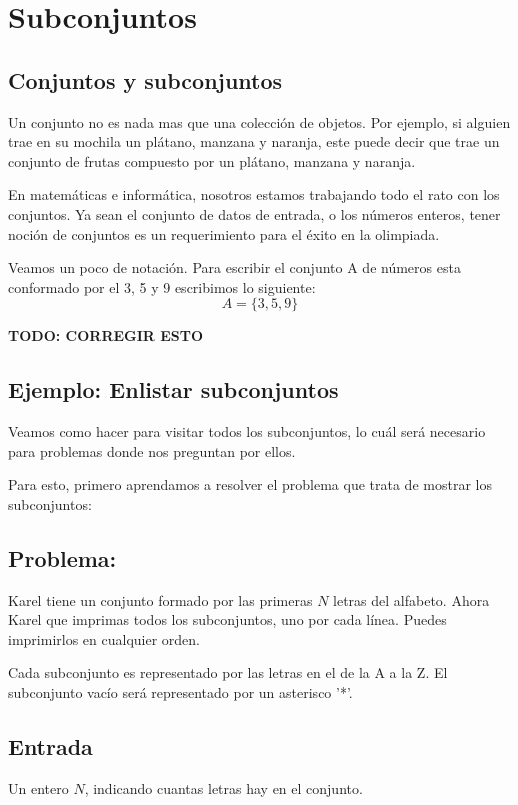 \section{Subconjuntos}

\subsection{Conjuntos y subconjuntos}

Un conjunto no es nada mas que una colección de objetos. Por ejemplo, si alguien trae en su mochila un plátano, manzana y naranja, este puede decir que trae un conjunto de frutas compuesto por un plátano, manzana y naranja.

En matemáticas e informática, nosotros estamos trabajando todo el rato con los conjuntos. Ya sean el conjunto de datos de entrada, o los números enteros, tener noción de conjuntos es un requerimiento para el éxito en la olimpiada.

Veamos un poco de notación. Para escribir el conjunto A de números esta conformado por el 3, 5 y 9 escribimos lo siguiente:
\[A=\{3,5,9\}\]

\begin{center}
	\textbf{TODO: CORREGIR ESTO}
\end{center}
\pagebreak

\subsection{Ejemplo: Enlistar subconjuntos}
Veamos como hacer para visitar todos los subconjuntos, lo cuál será necesario para problemas donde nos preguntan por ellos.

Para esto, primero aprendamos a resolver el problema que trata de mostrar los subconjuntos:

\subsection*{Problema:}

Karel tiene un conjunto formado por las primeras \(N\) letras del alfabeto. Ahora Karel que imprimas todos los subconjuntos, uno por cada línea. Puedes imprimirlos en cualquier orden.

Cada subconjunto es representado por las letras en el de la A a la Z. El subconjunto vacío será representado por un asterisco '*'.
\subsection*{Entrada}
Un entero \(N\), indicando cuantas letras hay en el conjunto.

